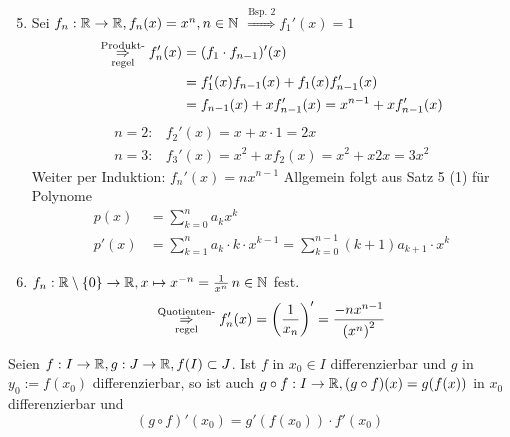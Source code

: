 \documentclass[../ana1.tex]{subfiles}
\begin{document}
\begin{bsp}\leavevmode
    \begin{enumerate}
        \setcounter{enumi}{4}
        \item Sei \( f_n : \mathbb{R} \rightarrow \mathbb{R}, f_n(x) = x^n, n\in\mathbb{N} \)
        \( \overset{\text{Bsp.\ 2}}{\Rightarrow} f_1'(x) = 1 \)
        \begin{align*}
            \overset{\text{Produkt-}}{\underset{\text{regel}}{\Rightarrow}} 
            f_n'(x) &= (f_1 \cdot f_{n-1})'(x) \\
            &= f_1'(x) f_{n-1}(x) + f_1(x) f_{n-1}'(x)\\
            &= f_{n-1}(x) + x f_{n-1}'(x) = x^{n-1} + x f_{n-1}'(x)
        \end{align*}
        \begin{align*}
            n=2: & f_2'(x) = x + x \cdot 1 = 2x\\
            n=3: & f_3'(x) = x^2 + x f_2(x) = x^2 + x 2x = 3x^2
        \end{align*}
        Weiter per Induktion: \( f_n'(x) = n x^{n-1} \)
        Allgemein folgt aus Satz 5 (1) für Polynome
        \begin{align*}
            p(x) &= \sum_{k=0}^n a_k x^k \\
            p'(x) &= \sum_{k=1}^n a_k \cdot k \cdot x^{k-1} 
            = \sum_{k=0}^{n-1} (k + 1)a_{k+1} \cdot x^k
        \end{align*}
        \item
        \( f_n: \mathbb{R} \setminus \{0\} \rightarrow \mathbb{R}, 
        x \mapsto x^{-n} = \frac{1}{x^n} \, n\in\mathbb{N} \) fest.
        \[ \overset{\text{Quotienten-}}{\underset{\text{regel}}{\Rightarrow}} 
        f_n'(x) = \left( \frac{1}{x_n} \right)' 
        = \frac{-n x^{n-1}}{{(x^n)}^2} \]
    \end{enumerate}
\end{bsp}
\begin{satz}[Kettenregel]
    Seien \( f: I \rightarrow \mathbb{R}, g : J \rightarrow \mathbb{R}, f(I) \subset J \). 
    Ist \( f \) in \( x_0 \in I \) differenzierbar und \(g\) in 
    \( y_0 := f(x_0) \) differenzierbar, so ist auch 
    \( g \circ f : I \rightarrow \mathbb{R}, (g \circ f)(x) = g(f(x)) \) in \(x_0\) 
    differenzierbar und 
    \[ (g \circ f)'(x_0) = g'(f(x_0)) \cdot f'(x_0) \]
\end{satz}
\end{document}

